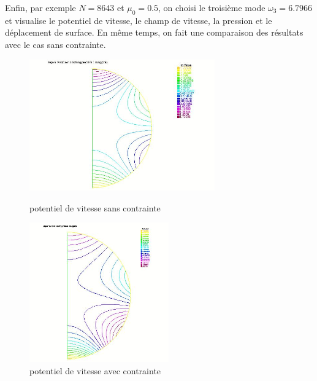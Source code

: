 \documentclass[a4paper]{report}
\begin{document}
\newpage
Enfin, par exemple $N = 8643$ et $\mu_0 = 0.5$, on choisi le troisième mode $\omega_3 = 6.7966$ et visualise le potentiel de vitesse, le champ de vitesse, la pression et le déplacement de surface. En même temps, on fait une comparaison des résultats avec le cas sans contrainte.
\begin{figure}
\begin{minipage}[h!]{0.5\linewidth}
\centering
\includegraphics[width=8cm]{2_3_1_potentiel_de_vitesse.jpeg}
\caption{potentiel de vitesse sans contrainte }
\end{minipage}
\begin{minipage}[h!]{0.5\linewidth}
\centering
\includegraphics[width=6cm]{2_3_2_potentiel_de_vitesse.jpeg}
\caption{potentiel de vitesse avec contrainte}
\end{minipage}
\end{figure}
\end{document}

